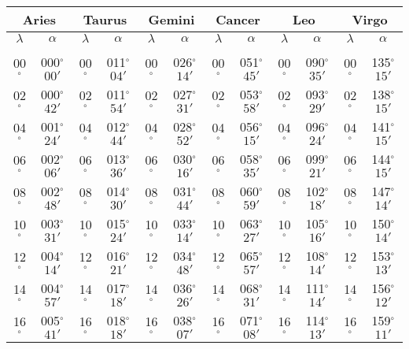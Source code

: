 \begin{table}
\centering
{\small \begin{tabular}{cc|cc|cc|cc|cc|cc}
\multicolumn{2}{c}{Aries}\vline & \multicolumn{2}{c}{Taurus} \vline& \multicolumn{2}{c}{Gemini} \vline& \multicolumn{2}{c}{Cancer}\vline &
\multicolumn{2}{c}{Leo}\vline & \multicolumn{2}{c}{Virgo}\\\hline
$\lambda$& $\alpha$& $\lambda$& $\alpha$& $\lambda$& $\alpha$& $\lambda$& $\alpha$& $\lambda$& $\alpha$& $\lambda$& $\alpha$\\\hline
&&&&&&&&&&&\\[-2ex]
00$^\circ$ & 000$^\circ$$00'$ & 00$^\circ$ & 011$^\circ$$04'$ & 00$^\circ$ & 026$^\circ$$14'$ & 00$^\circ$ & 051$^\circ$$45'$ & 00$^\circ$ & 090$^\circ$$35'$ & 00$^\circ$ & 135$^\circ$$15'$\\
02$^\circ$ & 000$^\circ$$42'$ & 02$^\circ$ & 011$^\circ$$54'$ & 02$^\circ$ & 027$^\circ$$31'$ & 02$^\circ$ & 053$^\circ$$58'$ & 02$^\circ$ & 093$^\circ$$29'$ & 02$^\circ$ & 138$^\circ$$15'$\\
04$^\circ$ & 001$^\circ$$24'$ & 04$^\circ$ & 012$^\circ$$44'$ & 04$^\circ$ & 028$^\circ$$52'$ & 04$^\circ$ & 056$^\circ$$15'$ & 04$^\circ$ & 096$^\circ$$24'$ & 04$^\circ$ & 141$^\circ$$15'$\\
06$^\circ$ & 002$^\circ$$06'$ & 06$^\circ$ & 013$^\circ$$36'$ & 06$^\circ$ & 030$^\circ$$16'$ & 06$^\circ$ & 058$^\circ$$35'$ & 06$^\circ$ & 099$^\circ$$21'$ & 06$^\circ$ & 144$^\circ$$15'$\\
08$^\circ$ & 002$^\circ$$48'$ & 08$^\circ$ & 014$^\circ$$30'$ & 08$^\circ$ & 031$^\circ$$44'$ & 08$^\circ$ & 060$^\circ$$59'$ & 08$^\circ$ & 102$^\circ$$18'$ & 08$^\circ$ & 147$^\circ$$14'$\\
10$^\circ$ & 003$^\circ$$31'$ & 10$^\circ$ & 015$^\circ$$24'$ & 10$^\circ$ & 033$^\circ$$14'$ & 10$^\circ$ & 063$^\circ$$27'$ & 10$^\circ$ & 105$^\circ$$16'$ & 10$^\circ$ & 150$^\circ$$14'$\\
12$^\circ$ & 004$^\circ$$14'$ & 12$^\circ$ & 016$^\circ$$21'$ & 12$^\circ$ & 034$^\circ$$48'$ & 12$^\circ$ & 065$^\circ$$57'$ & 12$^\circ$ & 108$^\circ$$14'$ & 12$^\circ$ & 153$^\circ$$13'$\\
14$^\circ$ & 004$^\circ$$57'$ & 14$^\circ$ & 017$^\circ$$18'$ & 14$^\circ$ & 036$^\circ$$26'$ & 14$^\circ$ & 068$^\circ$$31'$ & 14$^\circ$ & 111$^\circ$$14'$ & 14$^\circ$ & 156$^\circ$$12'$\\
16$^\circ$ & 005$^\circ$$41'$ & 16$^\circ$ & 018$^\circ$$18'$ & 16$^\circ$ & 038$^\circ$$07'$ & 16$^\circ$ & 071$^\circ$$08'$ & 16$^\circ$ & 114$^\circ$$13'$ & 16$^\circ$ & 159$^\circ$$11'$\\

\end{tabular}}
\end{table}
